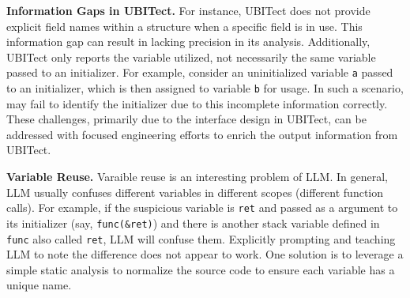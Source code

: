 \vspace{3pt}
\noindent
\textbf{Information Gaps in UBITect.} For instance, UBITect does not provide explicit field names within a structure when a specific field is in use. This information gap can result in \work lacking precision in its analysis. Additionally, UBITect only reports the variable utilized, not necessarily the same variable passed to an initializer. For example, consider an uninitialized variable \texttt{a} passed to an initializer, which is then assigned to variable \texttt{b} for usage. In such a scenario, \work may fail to identify the initializer due to this incomplete information correctly. These challenges, primarily due to the interface design in UBITect, can be addressed with focused engineering efforts to enrich the output information from UBITect.





\vspace{3pt}
\noindent
\textbf{Variable Reuse.} 
Varaible reuse is an interesting problem of LLM. In general, LLM usually confuses different variables in different scopes (\eg different function calls).
For example, if the suspicious variable is \texttt{ret} and passed as a argument to its 
initializer (say, \texttt{func(\&ret)}) and there is another stack variable
defined in \texttt{func} also called \texttt{ret}, LLM will confuse them. 
Explicitly prompting and teaching LLM to note the difference does not appear to work. One solution is to leverage a simple static analysis to normalize the source code to ensure each variable has a unique name. 




